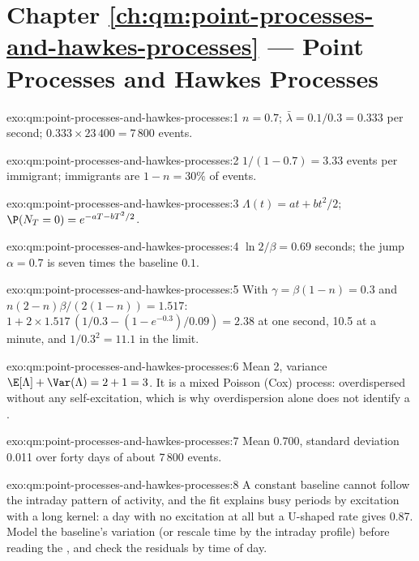 \section*{Chapter \ref{ch:qm:point-processes-and-hawkes-processes} --- Point Processes and Hawkes Processes}

\begin{solution}{exo:qm:point-processes-and-hawkes-processes:1}
$n = 0.7$; $\bar\lambda = 0.1/0.3 = 0.333$ per second; $0.333 \times 23\,400 = 7\,800$ events.
\end{solution}

\begin{solution}{exo:qm:point-processes-and-hawkes-processes:2}
$1/(1 - 0.7) = 3.33$ events per immigrant; immigrants are $1 - n = 30\%$ of events.
\end{solution}

\begin{solution}{exo:qm:point-processes-and-hawkes-processes:3}
$\Lambda(t) = at + bt^2/2$; $\P(N_T = 0) = e^{-aT - bT^2/2}$.
\end{solution}

\begin{solution}{exo:qm:point-processes-and-hawkes-processes:4}
$\ln 2/\beta = 0.69$ seconds; the jump $\alpha = 0.7$ is seven times the baseline $0.1$.
\end{solution}

\begin{solution}{exo:qm:point-processes-and-hawkes-processes:5}
With $\gamma = \beta(1 - n) = 0.3$ and $n(2 - n)\beta/(2(1 - n)) = 1.517$: $1 + 2 \times 1.517\,(1/0.3 - (1 - e^{-0.3})/0.09) = 2.38$ at
one second, 10.5 at a minute, and $1/0.3^2 = 11.1$ in the limit.
\end{solution}

\begin{solution}{exo:qm:point-processes-and-hawkes-processes:6}
Mean 2, variance $\E[\Lambda] + \Var(\Lambda) = 2 + 1 = 3$. It is a mixed Poisson (Cox) process: overdispersed without any
self-excitation, which is why overdispersion alone does not identify a .
\end{solution}

\begin{solution}{exo:qm:point-processes-and-hawkes-processes:7}
Mean 0.700, standard deviation 0.011 over forty days of about 7\,800 events.
\end{solution}

\begin{solution}{exo:qm:point-processes-and-hawkes-processes:8}
A constant baseline cannot follow the intraday pattern of activity, and the fit explains busy periods by
excitation with a long kernel: a day with no excitation at all but a U-shaped rate gives 0.87. Model the
baseline's variation (or rescale time by the intraday profile) before reading the , and check
the residuals by time of day.
\end{solution}

